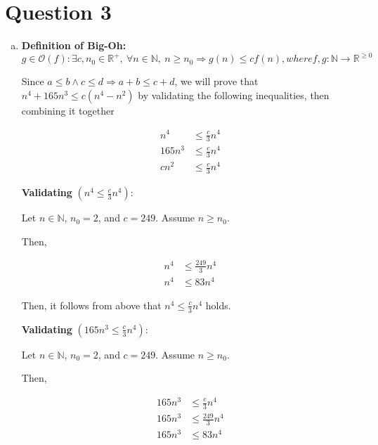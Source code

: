 \documentclass[12pt]{article}
\begin{document}
\section*{Question 3}
\begin{enumerate}[a.]
    \item

    \textbf{Definition of Big-Oh:} $g \in \mathcal{O}(f): \exists c,n_0 \in \mathbb{R}^{+},\:\forall n \in \mathbb{N},\:
    n \geq n_0 \Rightarrow g(n) \leq cf(n), where f,g: \mathbb{N} \to \mathbb{R}^{\geq 0}$

    \bigskip

    Since $a \leq b \land c \leq d \Rightarrow a + b \leq c + d$, we will prove
    that $n^4 + 165n^3 \leq c(n^4 - n^2)$ by validating the following
    inequalities, then combining it together

    \setcounter{equation}{0}
    \begin{align}
        n^4 &\leq \frac{c}{3}n^4\\
        165n^3 &\leq \frac{c}{3}n^4\\
        cn^2 &\leq \frac{c}{3}n^4
    \end{align}

    \bigskip

    \textbf{Validating} $(n^4 \leq \frac{c}{3}n^4)$:

    \bigskip

    Let $n \in \mathbb{N}$, $n_0 = 2$, and $c = 249$. Assume $n \geq n_0$.

    \bigskip

    Then,

    \begin{align}
        n^4 &\leq \frac{249}{3}n^4\\
        n^4 &\leq 83n^4
    \end{align}

    \bigskip

    Then, it follows from above that $n^4 \leq \frac{c}{3}n^4$ holds.

    \bigskip

    \textbf{Validating} $(165n^3 \leq \frac{c}{3}n^4)$:

    Let $n \in \mathbb{N}$, $n_0 = 2$, and $c = 249$. Assume $n \geq n_0$.

    \bigskip

    Then,

    \begin{align}
        165n^3 &\leq \frac{c}{3}n^4\\
        165n^3 &\leq \frac{249}{3}n^4\\
        165n^3 &\leq 83n^4
    \end{align}


\end{enumerate}
\end{document}
